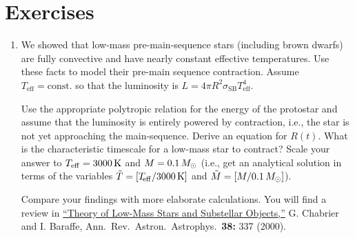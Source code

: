 \section{Exercises}
\begin{enumerate}
\item We showed that low-mass pre-main-sequence stars (including brown dwarfs) are fully convective and have nearly constant effective temperatures.  Use these facts to model their pre-main sequence contraction.  Assume $T_{\mathrm{eff}} = \mathrm{const.}$ so that the luminosity is $L = 4\pi R^{2} \sigma_{\mathrm{SB}} T_{\mathrm{eff}}^{4}$.

Use the appropriate polytropic relation for the energy of the protostar and assume that the luminosity is entirely powered by contraction, i.e., the star is not yet approaching the main-sequence. Derive an equation for $R(t)$. What is the characteristic timescale for a low-mass star to contract? Scale your answer to $T_{\mathrm{eff}} = 3000\,\mathrm{K}$ and $M = 0.1\,M_\odot$ (i.e., get an analytical solution in terms of the variables $\tilde{T} = [T_{\!\mathrm{eff}}/3000\,\mathrm{K}]$ and $\tilde{M} = [M/0.1\,M_\odot]$).

Compare your findings with more elaborate calculations.  You will find a review in \href{http://arxiv.org/abs/astro-ph/0006383}{``Theory of Low-Mass Stars and Substellar Objects,''} G. Chabrier and I. Baraffe, Ann.\ Rev.\ Astron.\ Astrophys.\ \textbf{38:} 337 (2000). 
\end{enumerate}



